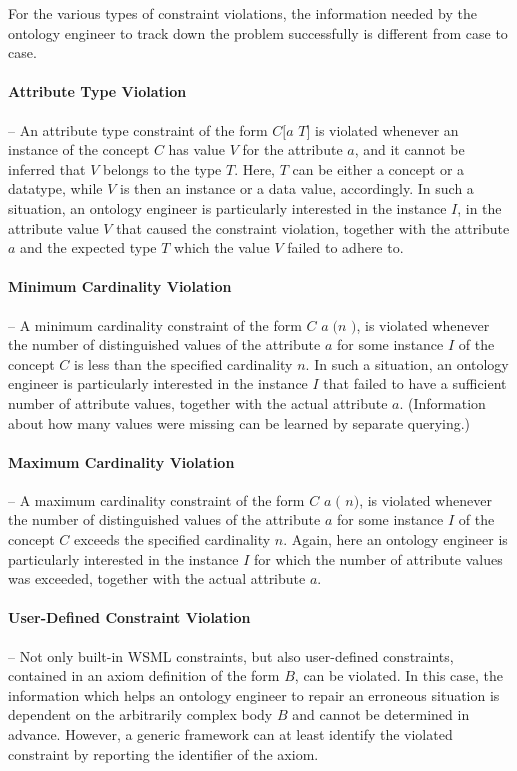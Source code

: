 For the various types of constraint violations, the information
needed by the ontology engineer to track down the problem
successfully is different from case to case.

\paragraph{Attribute Type Violation} -- An attribute type
constraint of the form $C[a$  $T]$ is violated
whenever an instance of the concept $C$ has value $V$ for the
attribute $a$, and it cannot be inferred that $V$ belongs to the
type $T$. Here, $T$ can be either a concept or a datatype, while
$V$ is then an instance or a data value, accordingly. In such a
situation, an ontology engineer is particularly interested in the
instance $I$, in the attribute value $V$ that caused the
constraint violation, together with the attribute $a$ and the
expected type $T$ which the value $V$ failed to adhere to.

\paragraph{Minimum Cardinality Violation} -- A minimum
cardinality constraint of the form  $C$ $a \; (n$
\wsml{*}$)$, is violated whenever the number of distinguished
values of the attribute $a$ for some instance $I$ of the concept
$C$ is less than the specified cardinality $n$. In such a
situation, an ontology engineer is particularly interested in the
instance $I$ that failed to have a sufficient number of attribute
values, together with the actual attribute $a$. (Information about
how many values were missing can be learned by separate querying.)

\paragraph{Maximum Cardinality Violation} -- A maximum
cardinality constraint of the form  $C$ $a \;
($ $n)$, is violated whenever the number of distinguished
values of the attribute $a$ for some instance $I$ of the concept
$C$ exceeds the specified cardinality $n$. Again, here an ontology
engineer is particularly interested in the instance $I$ for which
the number of attribute values was exceeded, together with the
actual attribute $a$.

\paragraph{User-Defined Constraint Violation} -- Not only
built-in WSML constraints, but also user-defined constraints,
contained in an axiom definition of the form  \axiomid
{} $B$, can be violated. In this case, the
information which helps an ontology engineer to repair an
erroneous situation is dependent on the arbitrarily complex body
$B$ and cannot be determined in advance. However, a generic
framework can at least identify the violated constraint by
reporting the identifier \axiomid of the axiom.

